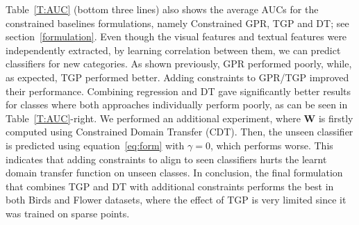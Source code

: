 Table~\ref{T:AUC} (bottom three lines) also shows the average AUCs for the constrained baselines formulations, namely Constrained GPR, TGP and DT; see section~\ref{formulation}. Even though the visual features and textual features were independently extracted, by learning correlation between them, we can predict classifiers for new categories. As shown previously, GPR performed poorly, while, as expected, TGP performed better. Adding constraints to GPR/TGP improved their performance. Combining regression and DT gave significantly better results for classes where both approaches individually perform poorly, as can be seen in Table~\ref{T:AUC}-right. We performed an additional experiment, where  $\mathbf{W}$ is firstly computed using Constrained Domain Transfer (CDT). Then, the unseen classifier is predicted using equation~\ref{eq:form} with $\gamma=0$, which performs worse. This indicates that adding constraints to align to seen classifiers hurts the learnt domain transfer function on unseen classes. In conclusion, the final formulation that combines TGP and DT with additional constraints performs the best in both Birds and Flower datasets, where the effect of TGP is very limited since it was trained on sparse points. 




